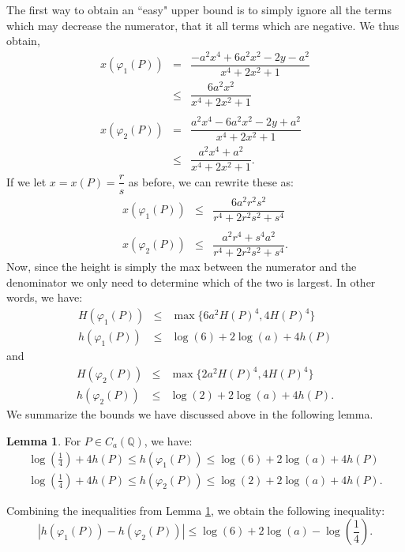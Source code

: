\documentclass{article}
\newcommand{\Q}{\mathbb{Q}}
\theoremstyle{definition}
\newtheorem{lemma}[theorem]{Lemma}
\begin{document}
\noindent The first way to obtain an ``easy" upper bound is to simply ignore all the terms which may decrease the numerator, that it all terms which are negative. We thus obtain,
\begin{eqnarray*}
    x(\varphi_1(P)) &=& \dfrac{-a^2 x^4 + 6a^2 x^2 - 2y - a^2}{x^4 + 2x^2 + 1} \\
    &\leq& \dfrac{6a^2x^2}{x^4 + 2x^2 + 1} \\\\
    x(\varphi_2(P)) &=& \dfrac{a^2 x^4 - 6a^2 x^2 - 2y + a^2}{x^4 + 2x^2 + 1} \\
    &\leq& \dfrac{a^2 x^4 + a^2}{x^4 + 2x^2 + 1}.
\end{eqnarray*}
\noindent If we let $x = x(P) = \dfrac{r}{s}$ as before, we can rewrite these as:
\begin{eqnarray*}
    x(\varphi_1(P)) &\leq& \dfrac{6a^2r^2s^2}{r^4 + 2r^2s^2 + s^4} \\\\
    x(\varphi_2(P)) &\leq& \dfrac{a^2 r^4 + s^4a^2}{r^4 + 2r^2s^2 + s^4}.
\end{eqnarray*}
\noindent Now, since the height is simply the max between the numerator and the denominator we only need to determine which of the two is largest. In other words, we have:
\begin{eqnarray*}
    H(\varphi_1(P)) &\leq& \max \{6a^2 H(P)^4, 4H(P)^4\} \\
    h(\varphi_1(P)) &\leq& \log(6) + 2\log(a) + 4h(P)
\end{eqnarray*}
and 
\begin{eqnarray*}
    H(\varphi_2(P)) &\leq& \max \{2a^2 H(P)^4, 4H(P)^4\} \\
    h(\varphi_2(P)) &\leq& \log(2) + 2\log(a) + 4h(P).
\end{eqnarray*}
\noindent We summarize the bounds we have discussed above in the following lemma.
\begin{lemma}\label{boundsonimages}
    For $P \in C_a(\Q)$, we have:
    \begin{eqnarray*}
        \log \left( \frac{1}{4} \right) + 4h(P) \leq h(\varphi_1(P)) \leq \log(6) + 2 \log(a) + 4 h(P) \\
        \log \left( \frac{1}{4} \right) + 4h(P) \leq h(\varphi_2(P)) \leq \log(2) + 2 \log(a) + 4 h(P).
    \end{eqnarray*}
\end{lemma}
\noindent Combining the inequalities from Lemma \ref{boundsonimages}, we obtain the following inequality:
\begin{equation}\label{5.1}
    \left| h(\varphi_1(P)) - h(\varphi_2(P)) \right| \leq \log(6) + 2 \log(a) - \log \left( \frac{1}{4} \right).
\end{equation}
\end{document}
